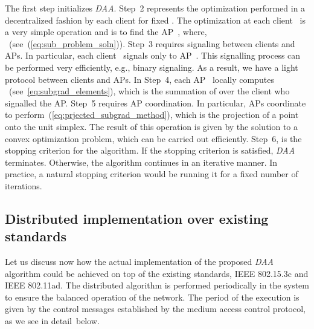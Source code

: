 \documentclass[journal, 10pt, twocolumn]{IEEEtran}
\begin{document}
The first step initializes \emph{DAA}. Step~2 represents the optimization performed in a decentralized fashion by each client for fixed . The optimization at each client~ is a very simple operation and is to find the AP~, where, ~(see~(\ref{eq:sub_problem_soln})). Step~3 requires signaling between clients and APs. In particular, each client~ signals only to AP~. This signalling process can be performed very efficiently, e.g., binary signaling. As a result, we have a light protocol between clients and APs. In Step~4, each AP~ locally computes ~(see~\ref{eq:subgrad_elements}), which is the summation of  over the client who signalled the AP. Step~5 requires AP coordination. In particular, APs coordinate to perform~(\ref{eq:prjected_subgrad_method}), which is the projection of a point onto the unit simplex. The result of this operation is given by the solution to a convex optimization problem, which can be carried out efficiently. Step~6, is the stopping criterion for the algorithm. If the stopping criterion is satisfied, \emph{DAA} terminates. Otherwise, the algorithm continues in an iterative manner. In practice, a natural stopping criterion would be running it for a fixed number of iterations.

\subsection{Distributed implementation over existing standards}\label{subsec:DAA_over_standards}

Let us discuss now how the actual implementation of the proposed \emph{DAA} algorithm could be achieved on top of the existing standards, IEEE 802.15.3c and IEEE 802.11ad. The distributed algorithm is performed periodically in the system to ensure the balanced operation of the network. The period of the execution is given by the control messages established by the medium access control protocol, as we see in detail~below.
\end{document}

